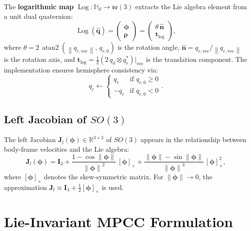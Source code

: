 \documentclass[journal]{IEEEtran}
\newcommand{\dq}{\hat{\bm{q}}}           %
\newcommand{\se}{\mathfrak{se}(3)}        %
\newcommand{\SO}{SO(3)}                   %
\newcommand{\R}{\mathbb{R}}              %
\newcommand{\Hd}{\mathbb{H}_d}           %
\newcommand{\norm}[1]{\left\| #1 \right\|}
\DeclareMathOperator{\Log}{Log}
\DeclareMathOperator{\atan}{atan2}
\begin{document}
The \textbf{logarithmic map} $\Log: \Hd \to \se$ extracts the Lie algebra element from a unit dual quaternion:
\begin{equation}
    \Log(\dq) = \begin{pmatrix} \bm{\phi} \\ \bm{\rho} \end{pmatrix} = \begin{pmatrix} \theta\, \hat{\bm{n}} \\ \bm{t}_{\text{log}} \end{pmatrix},
    \label{eq:log_map}
\end{equation}
where $\theta = 2\,\atan(\norm{q_{r,\text{vec}}},\, q_{r,0})$ is the rotation angle, $\hat{\bm{n}} = q_{r,\text{vec}} / \norm{q_{r,\text{vec}}}$ is the rotation axis, and $\bm{t}_{\text{log}} = \frac{1}{2}(2\, q_d \otimes q_r^*)\big|_{\text{vec}}$ is the translation component. The implementation ensures hemisphere consistency via:
\begin{equation}
    q_r \leftarrow \begin{cases} q_r & \text{if } q_{r,0} \geq 0 \\ -q_r & \text{if } q_{r,0} < 0 \end{cases}.
\end{equation}

\subsection{Left Jacobian of $\SO$}

The left Jacobian $\bm{J}_l(\bm{\phi}) \in \R^{3 \times 3}$ of $\SO$ appears in the relationship between body-frame velocities and the Lie algebra:
\begin{equation}
    \bm{J}_l(\bm{\phi}) = \bm{I}_3 + \frac{1 - \cos\norm{\bm{\phi}}}{\norm{\bm{\phi}}^2}\, [\bm{\phi}]_\times + \frac{\norm{\bm{\phi}} - \sin\norm{\bm{\phi}}}{\norm{\bm{\phi}}^3}\, [\bm{\phi}]_\times^2,
    \label{eq:left_jacobian}
\end{equation}
where $[\bm{\phi}]_\times$ denotes the skew-symmetric matrix. For $\norm{\bm{\phi}} \to 0$, the approximation $\bm{J}_l \approx \bm{I}_3 + \frac{1}{2}[\bm{\phi}]_\times$ is used.

\section{Lie-Invariant MPCC Formulation}
\end{document}
